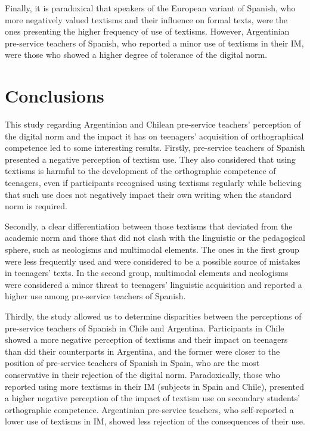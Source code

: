 \documentclass[english]{textolivre}
\begin{document}
Finally, it is paradoxical that speakers of the European variant of Spanish, who more negatively valued textisms and their influence on formal texts, were the ones presenting the higher frequency of use of textisms. However, Argentinian pre-service teachers of Spanish, who reported a minor use of textisms in their IM, were those who showed a higher degree of tolerance of the digital norm. 

\section{Conclusions}
This study regarding Argentinian and Chilean pre-service teachers’ perception of the digital norm and the impact it has on teenagers’ acquisition of orthographical competence led to some interesting results. Firstly, pre-service teachers of Spanish presented a negative perception of textism use. They also considered that using textisms is harmful to the development of the orthographic competence of teenagers, even if participants recognised using textisms regularly while believing that such use does not negatively impact their own writing when the standard norm is required.

Secondly, a clear differentiation between those textisms that deviated from the academic norm and those that did not clash with the linguistic or the pedagogical sphere, such as neologisms and multimodal elements. The ones in the first group were less frequently used and were considered to be a possible source of mistakes in teenagers’ texts. In the second group, multimodal elements and neologisms were considered a minor threat to teenagers’ linguistic acquisition and reported a higher use among pre-service teachers of Spanish.

Thirdly, the study allowed us to determine disparities between the perceptions of pre-service teachers of Spanish in Chile and Argentina. Participants in Chile showed a more negative perception of textisms and their impact on teenagers than did their counterparts in Argentina, and the former were closer to the position of pre-service teachers of Spanish in Spain, who are the most conservative in their rejection of the digital norm. Paradoxically, those who reported using more textisms in their IM (subjects in Spain and Chile), presented a higher negative perception of the impact of textism use on secondary students’ orthographic competence. Argentinian pre-service teachers, who self-reported a lower use of textisms in IM, showed less rejection of the consequences of their use. 
\end{document}
